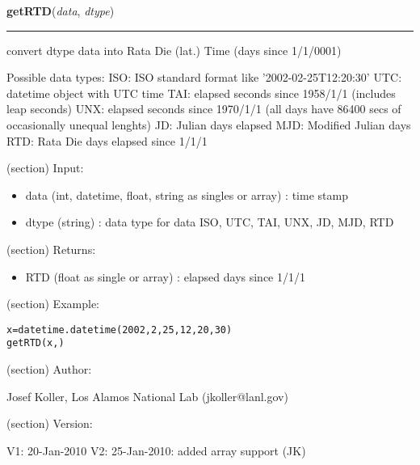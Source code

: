     \label{spacepy:ticktock:getRTD}

    \vspace{0.5ex}

\hspace{.8\funcindent}\begin{boxedminipage}{\funcwidth}

    \raggedright \textbf{getRTD}(\textit{data}, \textit{dtype})

    \vspace{-1.5ex}

    \rule{\textwidth}{0.5\fboxrule}
\setlength{\parskip}{2ex}
    convert dtype data into Rata Die (lat.) Time (days since 1/1/0001)

    Possible data types: ISO: ISO standard format like 
    '2002-02-25T12:20:30' UTC: datetime object with UTC time TAI: elapsed 
    seconds since 1958/1/1 (includes leap seconds) UNX: elapsed seconds 
    since 1970/1/1 (all days have 86400 secs of occasionally unequal 
    lenghts) JD: Julian days elapsed MJD: Modified Julian days RTD: Rata 
    Die days elapsed since 1/1/1

    (section) Input:

      \begin{itemize}
      \setlength{\parskip}{0.6ex}
        \item data (int, datetime, float, string as singles or array) : time 
          stamp

        \item dtype (string) : data type for data ISO, UTC, TAI, UNX, JD, MJD, 
          RTD

      \end{itemize}

    (section) Returns:

      \begin{itemize}
      \setlength{\parskip}{0.6ex}
        \item RTD (float as single or array) : elapsed days since 1/1/1

      \end{itemize}

    (section) Example:

\begin{alltt}
\pysrcprompt{{\textgreater}{\textgreater}{\textgreater} }x=datetime.datetime(2002,2,25,12,20,30)
\pysrcprompt{{\textgreater}{\textgreater}{\textgreater} }getRTD(x, )
\end{alltt}
    (section) Author:

      Josef Koller, Los Alamos National Lab (jkoller@lanl.gov)

    (section) Version:

      V1: 20-Jan-2010 V2: 25-Jan-2010: added array support (JK)

\setlength{\parskip}{1ex}
    \end{boxedminipage}

